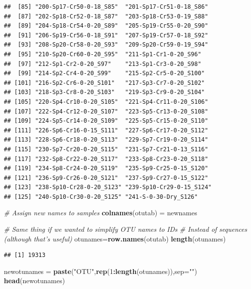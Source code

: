 \documentclass[]{article}
\newenvironment{Shaded}{\begin{snugshade}}{\end{snugshade}}
\newcommand{\CommentTok}[1]{\textcolor[rgb]{0.56,0.35,0.01}{\textit{#1}}}
\newcommand{\DataTypeTok}[1]{\textcolor[rgb]{0.13,0.29,0.53}{#1}}
\newcommand{\DecValTok}[1]{\textcolor[rgb]{0.00,0.00,0.81}{#1}}
\newcommand{\KeywordTok}[1]{\textcolor[rgb]{0.13,0.29,0.53}{\textbf{#1}}}
\newcommand{\NormalTok}[1]{#1}
\newcommand{\OperatorTok}[1]{\textcolor[rgb]{0.81,0.36,0.00}{\textbf{#1}}}
\newcommand{\StringTok}[1]{\textcolor[rgb]{0.31,0.60,0.02}{#1}}
\begin{document}
\begin{verbatim}
##  [85] "200-Sp17-Cr50-0-18_S85"  "201-Sp17-Cr51-0-18_S86" 
##  [87] "202-Sp18-Cr52-0-18_S87"  "203-Sp18-Cr53-0-19_S88" 
##  [89] "204-Sp18-Cr54-0-20_S89"  "205-Sp19-Cr55-0-20_S90" 
##  [91] "206-Sp19-Cr56-0-18_S91"  "207-Sp19-Cr57-0-18_S92" 
##  [93] "208-Sp20-Cr58-0-20_S93"  "209-Sp20-Cr59-0-19_S94" 
##  [95] "210-Sp20-Cr60-0-20_S95"  "211-Sp1-Cr1-0-20_S96"   
##  [97] "212-Sp1-Cr2-0-20_S97"    "213-Sp1-Cr3-0-20_S98"   
##  [99] "214-Sp2-Cr4-0-20_S99"    "215-Sp2-Cr5-0-20_S100"  
## [101] "216-Sp2-Cr6-0-20_S101"   "217-Sp3-Cr7-0-20_S102"  
## [103] "218-Sp3-Cr8-0-20_S103"   "219-Sp3-Cr9-0-20_S104"  
## [105] "220-Sp4-Cr10-0-20_S105"  "221-Sp4-Cr11-0-20_S106" 
## [107] "222-Sp4-Cr12-0-20_S107"  "223-Sp5-Cr13-0-20_S108" 
## [109] "224-Sp5-Cr14-0-20_S109"  "225-Sp5-Cr15-0-20_S110" 
## [111] "226-Sp6-Cr16-0-15_S111"  "227-Sp6-Cr17-0-20_S112" 
## [113] "228-Sp6-Cr18-0-20_S113"  "229-Sp7-Cr19-0-20_S114" 
## [115] "230-Sp7-Cr20-0-20_S115"  "231-Sp7-Cr21-0-13_S116" 
## [117] "232-Sp8-Cr22-0-20_S117"  "233-Sp8-Cr23-0-20_S118" 
## [119] "234-Sp8-Cr24-0-20_S119"  "235-Sp9-Cr25-0-15_S120" 
## [121] "236-Sp9-Cr26-0-20_S121"  "237-Sp9-Cr27-0-15_S122" 
## [123] "238-Sp10-Cr28-0-20_S123" "239-Sp10-Cr29-0-15_S124"
## [125] "240-Sp10-Cr30-0-20_S125" "241-S-0-30-Dry_S126"
\end{verbatim}

\begin{Shaded}
\begin{Highlighting}[]
\CommentTok{# Assign new names to samples}
\KeywordTok{colnames}\NormalTok{(otutab) =}\StringTok{ }\NormalTok{newnames}

\CommentTok{# Same thing if we wanted to simplify OTU names to IDs}
\CommentTok{# Instead of sequences (although that's useful)}
\NormalTok{otunames=}\KeywordTok{row.names}\NormalTok{(otutab)}
\KeywordTok{length}\NormalTok{(otunames)}
\end{Highlighting}
\end{Shaded}

\begin{verbatim}
## [1] 19313
\end{verbatim}

\begin{Shaded}
\begin{Highlighting}[]
\NormalTok{newotunames =}\StringTok{ }\KeywordTok{paste}\NormalTok{(}\StringTok{"OTU"}\NormalTok{,}\KeywordTok{rep}\NormalTok{(}\DecValTok{1}\OperatorTok{:}\KeywordTok{length}\NormalTok{(otunames)),}\DataTypeTok{sep=}\StringTok{""}\NormalTok{)}
\KeywordTok{head}\NormalTok{(newotunames)}
\end{Highlighting}
\end{Shaded}
\end{document}
